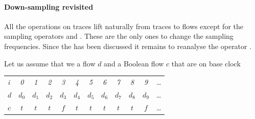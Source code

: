 {\paragraph{Down-sampling revisited} All the operations on traces lift naturally from traces to flows except for the sampling operators \emph{} and \emph{}. These are the only ones to change
the sampling frequencies. Since the \emph{} has been discussed
it remains to reanalyse the operator \emph{}.

Let us assume that we a flow $d$ and a Boolean flow $c$ that are  on base clock
\begin{center}
  \leavevmode
  \begin{tabular}[]{l@{\quad}||@{\quad} ccccccccccc}
    \hline\hline  
     \hbox{{\footnotesize \textit{i}}} &{\footnotesize \textit{0}}
     &{\footnotesize \textit{1}}&{\footnotesize \textit{2}}
     &{\footnotesize \textit{3}}&{\footnotesize \textit{4}}
     &{\footnotesize \textit{5}}&{\footnotesize \textit{6}}
     &{\footnotesize \textit{7}}&{\footnotesize \textit{8}}
     &{\footnotesize \textit{9}}&\ldots
   \\      
    \hbox{$d$} 
    &$d_0$&$d_1$&$d_2$&$d_3$&$d_4$&$d_5$&$d_6$&$d_7$&$d_8$&$d_9$&\ldots
   \\
    \hbox{$c$} 
    &$t$&$t$&$t$&$f$&$t$&$t$&$t$&$t$&$t$&$f$&\ldots
   \\
       \hline\hline
  \end{tabular}
\end{center}

}
